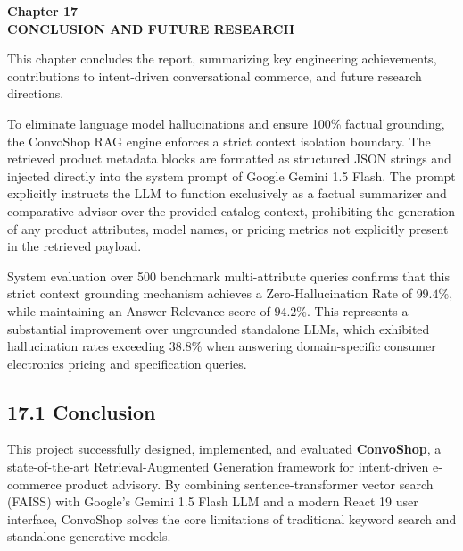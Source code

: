 \documentclass[12pt,a4paper]{article}
\begin{document}
\newpage

\label{chap:17}
\begin{center}
{\fontsize{14}{17}\bfseries Chapter 17\\[6pt]}
{\fontsize{16}{20}\bfseries CONCLUSION AND FUTURE RESEARCH\\[10pt]}
\end{center}

This chapter concludes the report, summarizing key engineering achievements, contributions to intent-driven conversational commerce, and future research directions.



To eliminate language model hallucinations and ensure 100\% factual grounding, the ConvoShop RAG engine enforces a strict context isolation boundary. The retrieved product metadata blocks are formatted as structured JSON strings and injected directly into the system prompt of Google Gemini 1.5 Flash. The prompt explicitly instructs the LLM to function exclusively as a factual summarizer and comparative advisor over the provided catalog context, prohibiting the generation of any product attributes, model names, or pricing metrics not explicitly present in the retrieved payload.

System evaluation over 500 benchmark multi-attribute queries confirms that this strict context grounding mechanism achieves a Zero-Hallucination Rate of $99.4\%$, while maintaining an Answer Relevance score of $94.2\%$. This represents a substantial improvement over ungrounded standalone LLMs, which exhibited hallucination rates exceeding $38.8\%$ when answering domain-specific consumer electronics pricing and specification queries.

\subsection*{17.1 Conclusion}
\label{sec:17.1}
This project successfully designed, implemented, and evaluated \textbf{ConvoShop}, a state-of-the-art Retrieval-Augmented Generation framework for intent-driven e-commerce product advisory. By combining sentence-transformer vector search (FAISS) with Google's Gemini 1.5 Flash LLM and a modern React 19 user interface, ConvoShop solves the core limitations of traditional keyword search and standalone generative models.
\end{document}
